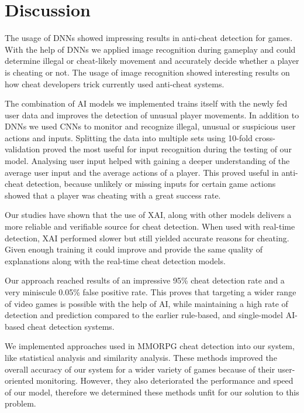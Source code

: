 \section{Discussion}
\label{ch:discussion}

The usage of DNNs showed impressing results in anti-cheat detection for games. 
With the help of DNNs we applied image recognition during gameplay and could determine illegal or cheat-likely movement and accurately decide whether a player is cheating or not. The usage of image recognition showed interesting results on how cheat developers trick currently used anti-cheat systems. 

The combination of AI models we implemented trains itself with the newly fed user data and improves the detection of unusual player movements. In addition to DNNs we used CNNs to monitor and recognize illegal, unusual or suspicious user actions and inputs.
Splitting the data into multiple sets using 10-fold cross-validation proved the most useful for input recognition during the testing of our model.
Analysing user input helped with gaining a deeper understanding of the average user input and the average actions of a player. This proved useful in anti-cheat detection, because unlikely or missing inputs for certain game actions showed that a player was cheating with a great success rate.

Our studies have shown that the use of XAI, along with other models delivers a more reliable and verifiable source for cheat detection. When used with real-time detection, XAI performed slower but still yielded accurate reasons for cheating. Given enough training it could improve and provide the same quality of explanations along with the real-time cheat detection models.

Our approach reached results of an impressive 95\% cheat detection rate and a very miniscule 0.05\% false positive rate. This proves that targeting a wider range of video games is possible with the help of AI, while maintaining a high rate of detection and prediction compared to the earlier rule-based, and single-model AI-based cheat detection systems.

We implemented approaches used in MMORPG cheat detection into our system, like statistical analysis and similarity analysis. These methods improved the overall accuracy of our system for a wider variety of games because of their user-oriented monitoring. However, they also deteriorated the performance and speed of our model, therefore we determined these methods unfit for our solution to this problem.

